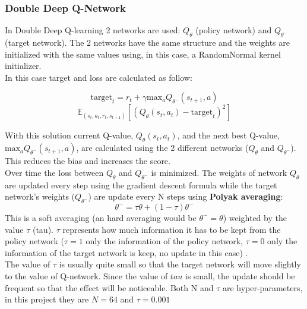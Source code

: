 \documentclass[14pt]{extarticle}
\def\sp{\vspace{5pt}}
\def\pp{\vspace{10pt}\newline}
\begin{document}
\begin{flushleft}
	\subsubsection{Double Deep Q-Network} \label{DDQN}
	\sp
	In Double Deep Q-learning 2 networks are used: $Q_{\theta}$ (policy network) and $Q_{\theta^{-}}$ (target network). The 2 networks have the same structure and the weights are initialized with the same values using, in this case, a RandomNormal kernel initializer. \\
	In this case target and loss are calculated as follow:

\[\text{target}_t = r_t + \gamma\text{max}_{a}Q_{\theta^{-}}(s_{t+1},a)\]
\[\mathbb{E}_{(s_t,a_t,r_t,s_{t+1})}[(Q_{\theta}(s_t,a_t) - \text{target}_t)^2]\] 

With this solution current Q-value, $Q_{\theta}(s_t,a_t)$, and the next best Q-value, $\text{max}_{a}Q_{\theta^{-}}(s_{t+1},a)$, are calculated using the 2 different networks ($Q_{\theta}$ and $Q_{\theta^{-}}$). This reduces the bias and increases the score.
\\
Over time the loss between $Q_{\theta}$ and $Q_{\theta^{-}}$ is minimized. The weights of network $Q_{\theta}$ are updated every step using the gradient descent formula while the target network's weights ($Q_{\theta^{-}}$) are update every N steps using \textbf{Polyak averaging}: 
\begin{equation} \label{eq:updateweights}
 \theta^{-} = \tau\theta + (1-\tau)\theta^{-} 
 \end{equation}
This is a soft averaging (an hard averaging would be $\theta^{-}=\theta$) weighted by the value $\tau$ (tau). $\tau$ represents how much information it has to be kept from the policy network ($\tau=1$ only the information of the policy network, $\tau=0$ only the information of the target network is keep, no update in this case) \cite{DDQN1,DDQN2}. \\
The value of $\tau$ is usually quite small so that the target network will move slightly to the value of Q-network. Since the value of $tau$ is small, the update should be frequent so that the effect will be noticeable.
\pp
Both N and $\tau$ are hyper-parameters, in this project they are $N=64$ and $\tau=0.001$
\begin{figure}[H]
\begin{center}
	\begin{tikzpicture}[x=25mm, y=0.09\textwidth, >=stealth]
	

\end{tikzpicture}
\end{center}
\end{figure}
\end{flushleft}
\end{document}
